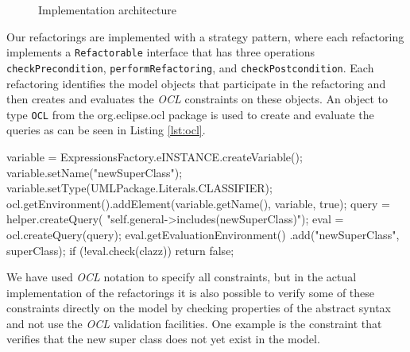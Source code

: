 \documentclass{llncs}
\begin{document}
\begin{figure}
 \caption{Implementation architecture}
 \label{fig:toolchain}
\end{figure}

Our refactorings are implemented with a strategy pattern, where each refactoring implements a \texttt{Refactorable}
interface that has three operations \texttt{check\-Precondition}, \texttt{perform\-Refactoring}, and \texttt{check\-Post\-condition}. 
Each refactoring identifies the model objects that participate in the refactoring and then creates and evaluates the \textit{OCL} 
constraints on these objects. An object to type \texttt{OCL} from the org.eclipse.ocl package is used to create and evaluate the 
queries as can be seen in Listing \ref{lst:ocl}.

\begin{lstsingle}[language=Java,caption=OCL validation in Java,label=lst:ocl]
variable = ExpressionsFactory.eINSTANCE.createVariable();
variable.setName("newSuperClass");
variable.setType(UMLPackage.Literals.CLASSIFIER);
ocl.getEnvironment().addElement(variable.getName(),
                                variable, true);
query = helper.createQuery(
    "self.general->includes(newSuperClass)");
eval = ocl.createQuery(query);
eval.getEvaluationEnvironment()
    .add("newSuperClass", superClass);
if (!eval.check(clazz))
    return false;
\end{lstsingle}

We have used \textit{OCL} notation to specify all constraints, but in the actual implementation of the refactorings it
is also possible to verify some of these constraints directly on the model by checking properties of the abstract syntax
and not use the \textit{OCL} validation facilities. One example is the constraint that verifies that the new super class does not
yet exist in the model.
\end{document}
